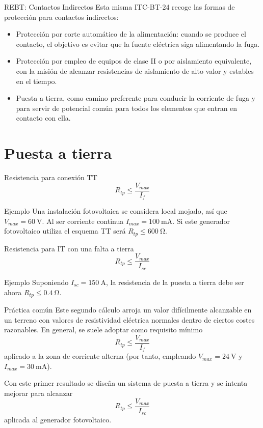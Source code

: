 \documentclass[xcolor={usenames,svgnames,dvipsnames}]{beamer}
\begin{document}
\begin{frame}[label=sec-2-3-4]{REBT: Contactos Indirectos}
Esta misma ITC-BT-24 recoge las formas de protección para contactos
indirectos:

\begin{itemize}
\item Protección por \alert{corte automático de la alimentación}: cuando se
produce el contacto, el objetivo es evitar que la fuente eléctrica
siga alimentando la fuga.

\item Protección por empleo de \alert{equipos de clase II o por aislamiento
equivalente}, con la misión de alcanzar resistencias de aislamiento
de alto valor y estables en el tiempo.

\item \alert{Puesta a tierra}, como camino preferente para conducir la corriente
de fuga y para servir de potencial común para todos los elementos que
entran en contacto con ella.
\end{itemize}
\end{frame}

\section{Puesta a tierra}
\label{sec-3}

\begin{frame}[label=sec-3-0-1]{Resistencia para conexión TT}
$$R_{tp}\leq\frac{V_{max}}{I_{f}}$$

\begin{block}{Ejemplo}
Una instalación fotovoltaica se considera local mojado,
así que $V_{max}=\SI{60}{\volt}$. Al ser corriente continua
$I_{max}=\SI{100}{\milli\ampere}$. Si este generador fotovoltaico
utiliza el esquema TT será $R_{tp}\leq\SI{600}{\ohm}$.
\end{block}
\end{frame}

\begin{frame}[label=sec-3-0-2]{Resistencia para IT con una falta a tierra}
$$R_{tp}\leq\frac{V_{max}}{I_{sc}}$$

\begin{block}{Ejemplo}
Suponiendo $I_{sc}=\SI{150}{\ampere}$, la resistencia de
la puesta a tierra debe ser ahora $R_{tp}\leq\SI{0.4}{\ohm}$.
\end{block}
\end{frame}

\begin{frame}[label=sec-3-0-3]{Práctica común}
Este segundo cálculo arroja un \alert{valor difícilmente alcanzable} en un
terreno con valores de resistividad eléctrica normales \alert{dentro de
ciertos costes razonables}. En general, se suele adoptar como requisito
mínimo $$R_{tp}\leq\frac{V_{max}}{I_{f}}$$ aplicado a la zona de
corriente alterna (por tanto, empleando $V_{max}=\SI{24}{\volt}$ y
$I_{max}=\SI{30}{\milli\ampere}$).

Con este primer resultado se diseña un sistema de puesta a tierra y se
intenta mejorar para alcanzar $$R_{tp}\leq\frac{V_{max}}{I_{sc}}$$
aplicada al generador fotovoltaico.
\end{frame}
\end{document}
